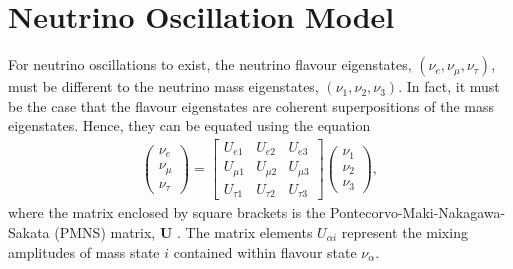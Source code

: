 \documentclass[aps,pra,12pt,notitlepage,tightenlines]{revtex4-1}
\newcommand\matr[1]{\bm{#1}}
\begin{document}
\section{Neutrino Oscillation Model}
\label{sec:osc}
For neutrino oscillations to exist, the neutrino flavour eigenstates, $(\nu_e, \nu_\mu, \nu_\tau)$, must be different to the neutrino mass eigenstates, $(\nu_1, \nu_2, \nu_3)$. In fact, it must be the case that the flavour eigenstates are coherent superpositions of the mass eigenstates. Hence, they can be equated using the equation
\begin{gather}
\label{eq:pmns}
 \begin{pmatrix}
 \nu_e \\
 \nu_\mu \\
 \nu_\tau 
 \end{pmatrix}
 =
 \begin{bmatrix}
 U_{e1} & U_{e2} & U_{e3} \\
 U_{\mu1} & U_{\mu2} & U_{\mu3} \\
 U_{\tau1} & U_{\tau2} & U_{\tau3}
 \end{bmatrix}
 \begin{pmatrix}
  \nu_1 \\
 \nu_2 \\
 \nu_3 
 \end{pmatrix}
 ,
\end{gather}
where the matrix enclosed by square brackets is the Pontecorvo-Maki-Nakagawa-Sakata (PMNS) matrix, $\matr{U}$ \cite{Maki1962, Pontecorvo1957}. The matrix elements $U_{\alpha i}$ represent the mixing amplitudes of mass state $i$ contained within flavour state $\nu_\alpha$.
\end{document}

